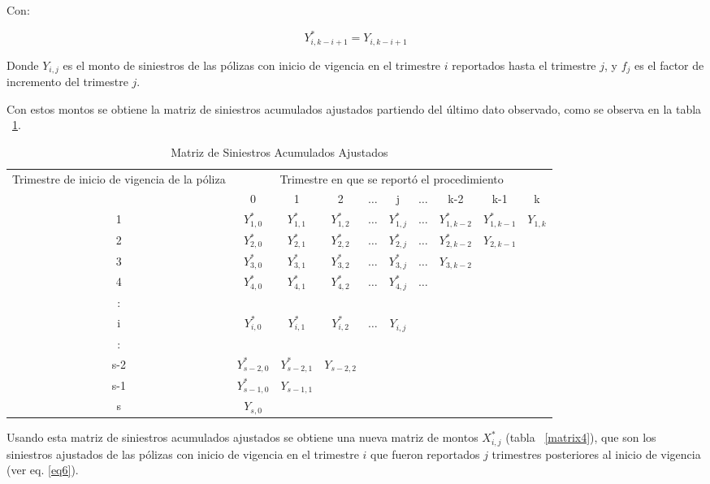 \documentclass[11pt,twoside,openright,spanish]{report}
\numberwithin{equation}{chapter}
\numberwithin{figure}{chapter}
\numberwithin{table}{chapter}
\begin{document}
	Con:

	$${Y}_{i,k-i+1}^{*}={Y}_{i,k-i+1}$$	

	Donde ${Y}_{i,j}$ es el monto de siniestros de las pólizas con inicio de vigencia en el trimestre $i$ reportados hasta el trimestre $j$, y ${f}_{j}$ es el factor de incremento del trimestre $j$.

	Con estos montos se obtiene la matriz de siniestros acumulados ajustados partiendo del último dato observado, como se observa en la tabla ~\ref{matrix3}.
		
	\begin{table}[ht]
		\centering

		\begin{tabularx}{\linewidth}{ c |ccccccccc}
			\multirow{2}{4cm}{Trimestre de inicio de vigencia de la póliza}
			& \multicolumn{9}{c}{Trimestre en que se reportó el procedimiento} \\ 
			& 0  & 1 & 2 & $ \dots $ & j & $\dots $ & k-2 & k-1 &  k \\
			\midrule
			1      &  $Y_{1,0}^{*}$ & $Y_{1,1}^{*}$ & $Y_{1,2}^{*}$ & $ \dots $ & $Y_{1,j}^{*}$ & $ \dots $ & $Y_{1,k-2}^{*}$ & $Y_{1,k-1}^{*}$ & $Y_{1,k}^{}$ \\
			2      &  $Y_{2,0}^{*}$ & $Y_{2,1}^{*}$ & $Y_{2,2}^{*}$ & $ \dots $ & $Y_{2,j}^{*}$ & $ \dots $ & $Y_{2,k-2}^{*}$ & $Y_{2,k-1}^{}$ & \\
			3      &  $Y_{3,0}^{*}$ & $Y_{3,1}^{*}$ & $Y_{3,2}^{*}$ & $ \dots $ & $Y_{3,j}^{*}$ & $ \dots $ & $Y_{3,k-2}^{}$ & & \\
			4      &  $Y_{4,0}^{*}$ & $Y_{4,1}^{*}$ & $Y_{4,2}^{*}$ & $ \dots $ & $Y_{4,j}^{*}$ & $ \dots $ & & & \\
			:      & & & & & & & & & \\
			i      &  $Y_{i,0}^{*}$ & $Y_{i,1}^{*}$ & $Y_{i,2}^{*}$ & $ \dots $ & $Y_{i,j}^{}$ & & & & \\
			:      & & & & & & & & & \\
			s-2      &  $Y_{s-2,0}^{*}$ & $Y_{s-2,1}^{*}$ & $Y_{s-2,2}^{}$ & & & & & & \\
			s-1      &  $Y_{s-1,0}^{*}$ & $Y_{s-1,1}^{}$ & & & & & & & \\
			s      &  $Y_{s,0}^{}$ & & & & & & & & \\
		\end{tabularx}
			\caption{Matriz de Siniestros Acumulados Ajustados}
	\label{matrix3}
	\end{table}
	
	Usando esta matriz de siniestros acumulados ajustados se obtiene una nueva matriz de montos $X_{i,j}^{*}$ (tabla ~\ref{matrix4}), que son los siniestros ajustados de las pólizas con inicio de vigencia en el trimestre $i$ que fueron reportados $j$ trimestres posteriores al inicio de vigencia (ver eq. \ref{eq6}).
	
\end{document}
